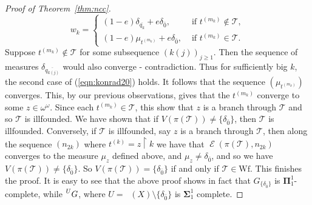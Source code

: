 \documentclass{amsart}
\theoremstyle{definition}
\newcommand{\wf}{\text{Wf}}
\newcommand{\bs}{\boldsymbol{\Sigma}}
\newcommand{\bp}{\boldsymbol{\Pi}}
\newcommand{\res}{\restriction}
\newcommand{\ww}{\omega^\omega}
\DeclareMathOperator{\Emp}{\mathcal{E}}%
\DeclareMathOperator{\MT}{\mathcal{M}_{\mathit T} }
\newcommand{\co}[1]{{\color{red}#1}}
\begin{document}
\begin{proof}[Proof of Theorem~\ref{thm:ncc}]
\begin{equation} \label{eqn:konrad20}
w_k =
  \begin{cases}
    (1 - e) \delta_{\overline{q_k}} + e \delta_{\bar{0}}, \quad & \textrm{ if } t^{(m_k)}\notin\mathcal{T}, \\
    (1 - e) \mu_{t^{(m_k)}} + e \delta_{\bar{0}}, & \textrm{ if }  t^{(m_k)} \in \mathcal{T}.
  \end{cases}
\end{equation}
Suppose $t^{(m_k)}\notin\mathcal{T}$ for some subsequence $(k(j))_{j \ge 1}$. Then the sequence of measures $\delta_{\overline{q_{k(j)}}}$ would also converge - contradiction.
Thus for sufficiently big $k$, the second case of (\ref{eqn:konrad20}) holds. It follows that the sequence
$(\mu_{t^{(m_k)}})$ converges.
%
This, by our previous
observations, gives that the $t^{(m_k)}$ converge to some $z \in \ww$.
Since each $t^{(m_k)} \in \mathcal{T}$, this show that $z$ is a branch through $\mathcal{T}$
and so $\mathcal{T}$ is illfounded. We have shown that if $V(\pi(\mathcal{T})) \neq \{ \delta_{\bar 0}\}$,
then $\mathcal{T}$ is illfounded. Conversely, if $\mathcal{T}$ is illfounded,
say $z$ is a branch through $\mathcal{T}$, then along the sequence $(n_{2k})$ where
$t^{(k)}=z\res k$ we have that $\Emp(\pi(\mathcal{T}), n_{2k})$ converges to the measure $\mu_z$
defined above, and $\mu_z \neq \delta_{\bar 0}$, and so we have $V(\pi(\mathcal{T}))
\neq \{ \delta_{\bar 0}\}$. So $V(\pi(\mathcal{T}))=\{\delta_{\bar{0}}\}$
if and only if $\mathcal{T}\in\wf$. This finishes the proof. It is easy to see that the above proof shows in fact that $G_{\{\delta_{\bar{0}}\}}$ is $\bp^1_1$-complete, while $\prescript {U}{}{G}$, where $U=\MT(X)\setminus\{\delta_{\bar{0}}\}$ is $\bs^1_1$ complete.
\end{proof}
\end{document}
